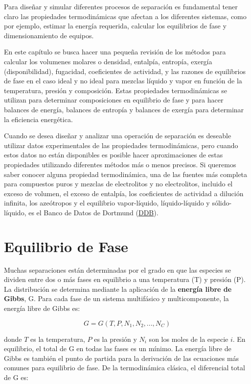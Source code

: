 \documentclass[11pt]{book}
\begin{document}
Para diseñar y simular diferentes procesos de separación es fundamental tener claro las propiedades termodinámicas que afectan a los diferentes sistemas, como por ejemplo, estimar la energía requerida, calcular los equilibrios de fase y dimensionamiento de equipos. 

En este capítulo se busca hacer una pequeña revisión de los métodos para calcular los volumenes molares o densidad, entalpía, entropía, exergía (disponibilidad), fugacidad, coeficientes de actividad, y las razones de equilibrios de fase en el caso ideal y no ideal para mezclas líquido y vapor en función de la temperatura, presión y composición. Estas propiedades termodinámicas se utilizan para determinar composiciones en equilibrio de fase y para hacer balances de energía, balances de entropía y balances de exergía para determinar la eficiencia energética. 

Cuando se desea diseñar y analizar una operación de separación es deseable utilizar datos experimentales de las propiedades termodinámicas, pero cuando estos datos no están disponibles es posible hacer aproximaciones de estas propiedades utilizando diferentes métodos más o menos precisos. Si queremos saber conocer alguna propiedad termodinámica, una de las fuentes más completa para compuestos puros y mezclas de electrolitos y no electrolitos, incluido el exceso de volumen, el exceso de entalpía, los coeficientes de actividad a dilución infinita, los azeótropos y el equilibrio vapor-líquido, líquido-líquido y sólido-líquido, es el Banco de Datos de Dortmund (\href{http://www.sharelatex.com}{DDB}).

\section{Equilibrio de Fase}

Muchas separaciones están determinadas por el grado en que las especies se dividen entre dos o más fases en equilibrio a una temperatura (T) y presión (P). La distribución se determina mediante la aplicación de la \textbf{energía libre de Gibbs}, G. Para cada fase de un sistema multifásico y multicomponente, la energía libre de Gibbs es:

\begin{equation}
    \label{eq:EnergiaLibreGibbs_1}
    G = G(T,P,N_1,N_2, ..., N_C)
\end{equation}

donde $T$ es la temperatura, $P$ es la presión y $N_i$ son los moles de la especie $i$. En equilibrio, el total de G en todas las fases es un mínimo. La energía libre de Gibbs es también el punto de partida para la derivación de las ecuaciones más comunes para equilibrio de fase. De la termodinámica clásica, el diferencial total de G es:
\end{document}
